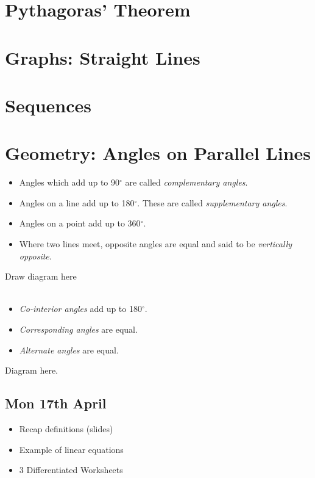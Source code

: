 \documentclass{article}
\begin{document}
\section{Pythagoras' Theorem}

\section{Graphs: Straight Lines}

\section{Sequences}

\newpage
\section{Geometry: Angles on Parallel Lines}

\begin{itemize}
    \item Angles which add up to 90\(^{\circ}\) are called \textit{complementary angles}.
    \item Angles on a line add up to 180\(^\circ\). These are called \textit{supplementary angles}.
    \item Angles on a point add up to 360\(^\circ\).
    \item Where two lines meet, opposite angles are equal and said to be \textit{vertically opposite}.
\end{itemize}

Draw diagram here
\\
\\

\begin{itemize}
    \item \textit{Co-interior angles} add up to 180\(^\circ\).
    \item \textit{Corresponding angles} are equal.
    \item \textit{Alternate angles} are equal.
\end{itemize}

Diagram here.

\subsection{Mon 17th April}

\begin{itemize}
    \item Recap definitions (slides)
    \item Example of linear equations
    \item 3 Differentiated Worksheets
\end{itemize}
\end{document}

